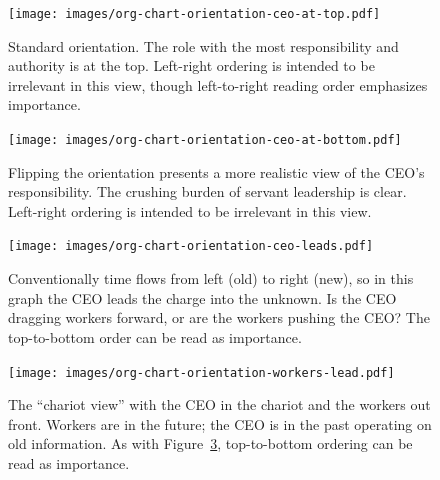 \begin{figure}
\texttt{[image: images/org-chart-orientation-ceo-at-top.pdf]}
\caption{Standard orientation. The role with the most responsibility and authority is at the top. Left-right ordering is intended to be irrelevant in this view, though left-to-right reading order emphasizes importance.}
\label{fig:org_chart_orientation_ceo-at-top}
\end{figure}

\begin{figure}
\texttt{[image: images/org-chart-orientation-ceo-at-bottom.pdf]}
\caption{Flipping the orientation presents a more realistic view of the CEO's responsibility. The crushing burden of servant leadership is clear. Left-right ordering is intended to be irrelevant in this view.}
\label{fig:org_chart_orientation_ceo-at-bottom}
\end{figure}

\begin{figure}
\texttt{[image: images/org-chart-orientation-ceo-leads.pdf]}
\caption{Conventionally time flows from left (old) to right (new), so in this graph the CEO leads the charge into the unknown. Is the CEO dragging workers forward, or are the workers pushing the CEO? The top-to-bottom order can be read as importance. }
\label{fig:org_chart_orientation_ceo-leads}
\end{figure}

\begin{figure}
\texttt{[image: images/org-chart-orientation-workers-lead.pdf]}
\caption{The ``chariot view'' with the CEO in the chariot and the workers out front. Workers are in the future; the CEO is in the past operating on old information. As with Figure~\ref{fig:org_chart_orientation_ceo-leads}, top-to-bottom ordering can be read as importance. }
\label{fig:org_chart_orientation_ceo-follows}
\end{figure}

